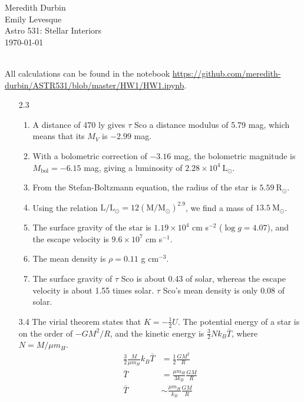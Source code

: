 \documentclass[11pt]{article}
\newcommand\lsol{\mathrm{L}_\odot}
\newcommand\rsol{\mathrm{R}_\odot}
\newcommand\msol{\mathrm{M}_\odot}
\begin{document}
\begin{flushright}Meredith Durbin\\
Emily Levesque\\
Astro 531: Stellar Interiors\\
\today\\

\end{flushright}

 \\[6pt]

All calculations can be found in the notebook \url{https://github.com/meredith-durbin/ASTR531/blob/master/HW1/HW1.ipynb}.

\begin{enumerate}

\item [2.3]
	\begin{enumerate}
	
    \item A distance of 470 ly gives $\tau$ Sco a distance modulus of 5.79 mag, which means that its $M_V$ is $-2.99$ mag.
    
    \item With a bolometric correction of $-3.16$ mag, the bolometric magnitude is $M_\mathrm{bol} = -6.15$ mag, giving a luminosity of $2.28 \times 10^4~\lsol$.
    
    \item From the Stefan-Boltzmann equation, the radius of the star is $5.59~\rsol$.

    \item Using the relation $\mathrm{L}/\lsol = 12(\mathrm{M}/\msol)^{2.9}$, we find a mass of $13.5~\msol$.
    
    \item The surface gravity of the star is $1.19 \times 10^4$ cm s$^{-2}$ ($\log g = 4.07$), and the escape velocity is $9.6 \times 10^7$ cm s$^{-1}$.
    
    \item The mean density is $\rho = 0.11$ g cm$^{-3}$.
    
    \item The surface gravity of $\tau$ Sco is about 0.43 of solar, whereas the escape velocity is about 1.55 times solar. $\tau$ Sco's mean density is only 0.08 of solar.
    
    \end{enumerate}

\item [3.4]
	The virial theorem states that $K = -\frac{1}{2}U$. The potential energy of a star is on the order of $-GM^2/R$, and the kinetic energy is $\frac{3}{2}Nk_B\bar{T}$, where $N = M/\mu m_H$. 
	\begin{align}
	\frac{3}{2}\frac{M}{\mu m_H}k_B\bar{T} &= \frac{1}{2}\frac{GM^2}{R} \\
	\bar{T} &= \frac{\mu m_H}{3k_B} \frac{GM}{R} \\
	\bar{T} &\sim \frac{\mu m_H}{k_B} \frac{GM}{R}
	\end{align}


\end{enumerate}
\end{document}
